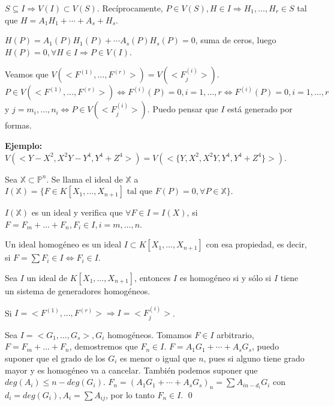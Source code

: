 \begin{Dem}
$S\subseteq I \Rightarrow V(I) \subset V(S)$. Recíprocamente, $P\in V(S),H\in I \Rightarrow H_1,\dots, H_r  \in S$ tal que $H=A_1H_1+\cdots +A_s+H_s$. 

$H(P)=A_1(P)H_1(P)+\cdots A_s(P)H_s(P)=0$, suma de ceros, luego $H(P)=0, \forall H\in I \Rightarrow P\in V(I)$. 

Veamos que $V(<F^{(1)},\dots , F^{(r)}>)=V(<F_j^{(i)}>)$. $P\in V(<F^{(1)},\dots , F^{(r)}>) \Leftrightarrow F^{(i)}(P)=0, i=1,\dots , r \Leftrightarrow F^{(i)}(P)=0, i=1,\dots , r$ y $j=m_i,\dots ,n_i \Leftrightarrow P\in V(<F^{(i)}_j>)$. Puedo pensar que $I$ está generado por formas. 
\end{Dem}

\textbf{Ejemplo:}
$V(<Y-X^2,X^2Y-Y^4,Y^4+Z^4>)=V(<\{Y,X^2,X^2Y,Y^4,Y^4+Z^4\}>)$.


\begin{Def}
Sea $\mathbb{X} \subset \mathbb{P}^n$. Se llama el ideal de $\mathbb{X}$ a $I(\mathbb{X})= \{ F \in K[X_1,\dots, X_{n+1}] \text{ tal que } F(P)=0, \forall P \in \mathbb{X}\} $. 
\end{Def}

\begin{nota}
$I(\mathbb{X})$ es un ideal y verifica que $\forall F \in I=I(X)$, si $F=F_m+\dots + F_n, F_i\in I, i=m,\dots , n$.  
\end{nota}

\begin{Def}
Un ideal homogéneo es un ideal $I\subset K[X_1,\dots ,X_{n+1}]$ con esa propiedad, es decir, si $F=\sum F_i \in I \Leftrightarrow F_i\in I$. 
\end{Def}

\begin{Prop}
Sea $I$ un ideal de $K[X_1,\dots , X_{n+1}]$, entonces $I$ es homogéneo si y sólo si $I$ tiene un sistema de generadores homogéneos. 
\end{Prop}

\begin{Dem}
\framebox{$\Rightarrow $} Si $I=<F^{(1)},\dots , F^{(r)}> \Rightarrow I=<F^{(i)}_j>$. 

\framebox{$\Leftarrow $} Sea $I=<G_1,\dots , G_s>, G_i$ homogéneos. Tomamos $F\in I$ arbitrario, $F=F_m+\dots + F_n$, demostremos que $F_n \in I$. $F=A_1G_1+\cdots + A_sG_s$, puedo suponer que el grado de los $G_i$ es menor o igual que $n$, pues si alguno tiene grado mayor y es homogéneo va a cancelar. También podemos suponer que $deg(A_i) \le n- deg(G_i)$. $F_n = (A_1G_1+\cdots + A_s G_s)_n = \sum A_{in-d_i}G_i$ con $d_i = deg(G_i), A_i= \sum A_{ij}$, por lo tanto $F_n\in I$.  \qed
\end{Dem}

